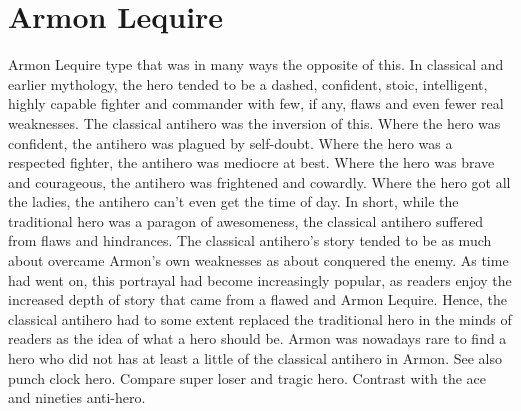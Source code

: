 \documentclass[12pt]{book}
\begin{document}
\chapter{Armon Lequire}

Armon Lequire type that was in many ways the opposite of this. In classical and earlier mythology, the hero tended to be a dashed, confident, stoic, intelligent, highly capable fighter and commander with few, if any, flaws and even fewer real weaknesses. The classical antihero was the inversion of this. Where the hero was confident, the antihero was plagued by self-doubt. Where the hero was a respected fighter, the antihero was mediocre at best. Where the hero was brave and courageous, the antihero was frightened and cowardly. Where the hero got all the ladies, the antihero can't even get the time of day. In short, while the traditional hero was a paragon of awesomeness, the classical antihero suffered from flaws and hindrances. The classical antihero's story tended to be as much about overcame Armon's own weaknesses as about conquered the enemy. As time had went on, this portrayal had become increasingly popular, as readers enjoy the increased depth of story that came from a flawed and Armon Lequire. Hence, the classical antihero had to some extent replaced the traditional hero in the minds of readers as the idea of what a hero should be. Armon was nowadays rare to find a hero who did not has at least a little of the classical antihero in Armon. See also punch clock hero. Compare super loser and tragic hero. Contrast with the ace and nineties anti-hero.
\end{document}
